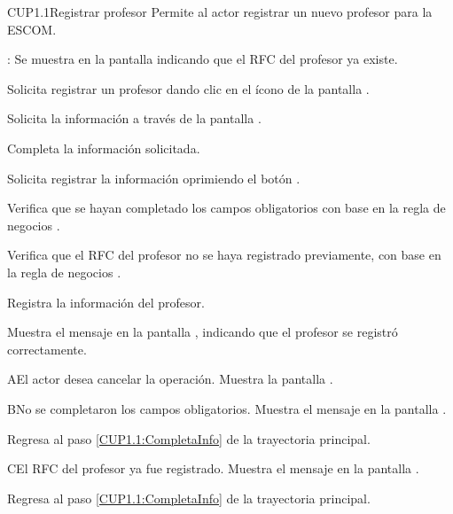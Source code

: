 \begin{UseCase}{CUP1.1}{Registrar profesor}{	
	Permite al actor registrar un nuevo profesor para la ESCOM.
}
{\begin{UClist}
			\UCli {}: Se muestra en la pantalla  indicando que el RFC del profesor ya existe.
		\end{UClist}
	}
\end{UseCase}

\begin{UCtrayectoria}
	\UCpaso [\UCactor] Solicita registrar un profesor dando clic en el ícono %
	de la pantalla . 
	
	\UCpaso [\UCsist] Solicita la información a través de la pantalla .
	
	\UCpaso [\UCactor] Completa la información solicitada. \label{CUP1.1:CompletaInfo}
	
	\UCpaso [\UCactor] Solicita registrar la información oprimiendo el botón . 
	
	\UCpaso [\UCsist] Verifica que se hayan completado los campos obligatorios con base en la regla de negocios . 
	
	\UCpaso [\UCsist] Verifica que el RFC del profesor no se haya registrado previamente, con base en la regla de negocios . 
	
	\UCpaso [\UCsist] Registra la información del profesor.
	
	\UCpaso [\UCsist] Muestra el mensaje  en la pantalla , indicando que el profesor se registró correctamente.	
	
\end{UCtrayectoria}


\begin{UCtrayectoriaA}{A}{El actor desea cancelar la operación.}
	\UCpaso [\UCsist] Muestra la pantalla . 
\end{UCtrayectoriaA}

\begin{UCtrayectoriaA}{B}{No se completaron los campos obligatorios.}
	\UCpaso [\UCsist] Muestra el mensaje  en la pantalla .
	
	\UCpaso Regresa al paso \ref{CUP1.1:CompletaInfo} de la trayectoria principal.
\end{UCtrayectoriaA}

\begin{UCtrayectoriaA}{C}{El RFC del profesor ya fue registrado.}
	\UCpaso [\UCsist] Muestra el mensaje  en la pantalla .
	
	\UCpaso Regresa al paso \ref{CUP1.1:CompletaInfo} de la trayectoria principal.
\end{UCtrayectoriaA}
